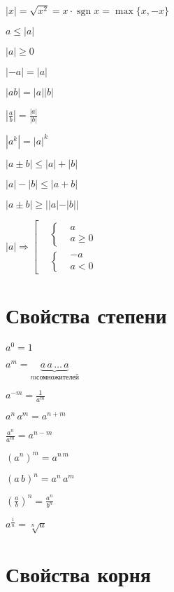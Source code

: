$ |x| = \sqrt{x^2} = x \cdot \mathop{\text{sgn}} x = \max \{x, -x\} $

$ a \leqslant |a| $

$ |a| \geqslant 0 $

$ |-a| = |a| $

$ |ab| = |a| |b| $

$ \left|\frac{a}{b}\right| = \frac{|a|}{|b|} $

$ |a^k| = |a|^k $

$ |a\pm b| \leqslant |a| + |b| $

$ |a| - |b| \leqslant |a+b| $

$ |a\pm b| \geqslant ||a| - |b|| $

$ |a| \Rightarrow \left[ \begin{aligned}
	& \left\{ \begin{aligned}
		& a \\
		& a \geqslant 0
	\end{aligned}\right. \\
	& \left\{ \begin{aligned}
		& -a \\
		& a < 0
	\end{aligned}\right.
\end{aligned}\right. $


\section{Свойства степени}

$ a^0 = 1 $

$ a^m = \underbrace{a\, a \, \ldots \, a }_{m сомножителей} $

$ a^{-m} = \frac{1}{a^m} $

$ a^n\, a^m = a^{n+m} $

$ \frac{a^n}{a^m} = a^{n-m} $

$ (a^n)^m = a^{n\, m} $

$ (a\, b)^n = a^n\, a^m $

$ \left(\frac{a}{b} \right)^n = \frac{a^n}{b^n} $

$ a^{\frac{1}{n}} = \sqrt[n]{a} $


\section{Свойства корня}

